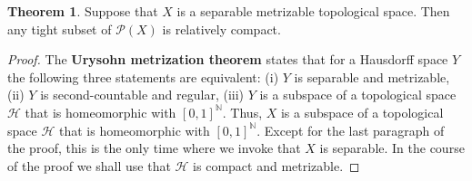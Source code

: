 \documentclass{article}
\theoremstyle{definition}
\newtheorem{theorem}{Theorem}
\theoremstyle{definition}
\begin{document}
\begin{theorem}
Suppose that $X$ is a separable metrizable topological space. Then any tight subset of  $\mathscr{P}(X)$ is  relatively compact.
\label{halfprokh}
\end{theorem}
\begin{proof}
The \textbf{Urysohn metrization theorem} states that for a Hausdorff space $Y$ the following three statements are equivalent:
(i) $Y$ is separable and metrizable, (ii) $Y$ is  second-countable and regular, (iii)  $Y$ is a subspace of a topological space $\mathscr{H}$ that is homeomorphic
with $[0,1]^\mathbb{N}$. Thus,  $X$ is a subspace of  a topological space $\mathscr{H}$ that
is homeomorphic with $[0,1]^\mathbb{N}$. Except for the last paragraph of the proof, this is the only time where we invoke that $X$ is separable. In the course of the proof we shall
 use that $\mathscr{H}$
is compact and metrizable.


\end{proof}
\end{document}
